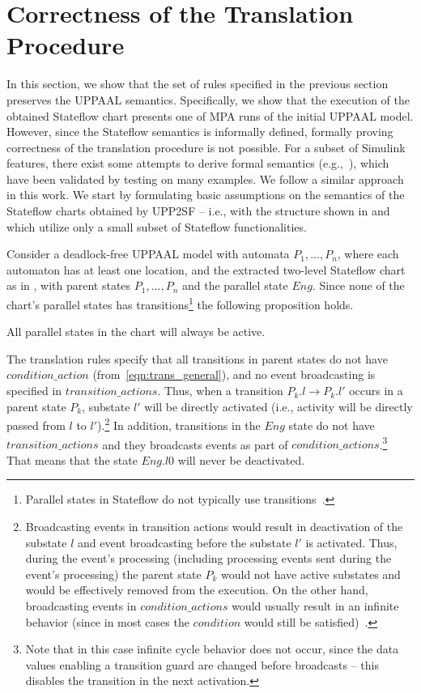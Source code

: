 \section{Correctness of the Translation Procedure}
\label{sec:correc}

In this section, we show that the set of rules specified in the previous section preserves the UPPAAL semantics. Specifically, we show that the execution of the obtained Stateflow chart presents one of MPA runs of the initial UPPAAL model. 
However, since the Stateflow semantics is informally defined, formally proving correctness of the translation procedure is not possible. For a subset of Simulink features, there exist some attempts to derive formal semantics (e.g.,~\cite{SFsem1,SFsem2}), which have been validated by testing on many examples. We follow a similar approach in this work. We start by formulating basic assumptions on the semantics of the Stateflow charts obtained by UPP2SF -- i.e., with the structure shown in  and which utilize only a small subset of Stateflow functionalities. 


Consider a deadlock-free UPPAAL model with automata $P_1,...,P_n$, where each automaton has at least one location, and the extracted two-level Stateflow chart as in , with parent states $P_1,...,P_n$ and the parallel state $Eng$. Since none of the chart's parallel states has transitions\footnote{Parallel states in Stateflow do not typically use transitions~\cite{stateflow,SFsem1}.} the following proposition holds.

\begin{proposition}
\label{p1_allactive}
All parallel states in the chart will always be active.
\end{proposition}

The translation rules specify that all transitions in parent states do not have $condition\_action$  (from~\eqref{eqn:trans_general}), and no event broadcasting is specified in $transition\_actions$. Thus, when a transition $P_k.l\rightarrow P_k.l'$ occurs in a parent state $P_k$, substate $l'$ will be directly activated (i.e., activity will be directly passed from $l$ to $l'$).\footnote{Broadcasting events in transition actions would result in deactivation of the substate $l$ and event broadcasting before the substate $l'$ is activated. Thus, during the event's processing (including processing events sent during the event's processing) the parent state $P_k$ would not have active substates and would be effectively removed from the execution. On the other hand, broadcasting events in $condition\_actions$ would usually result in an infinite behavior (since in most cases the $condition$ would still be satisfied)~\cite{stateflow}.} 
In addition, transitions in the $Eng$ state do not have $transition\_actions$ and they broadcasts events as part of $condition\_actions$.\footnote{Note that in this case infinite cycle behavior does not occur, since the data values enabling a transition guard are changed before broadcasts -- this disables the transition in the next activation.} That means that the state $Eng.l0$ will never be deactivated.

